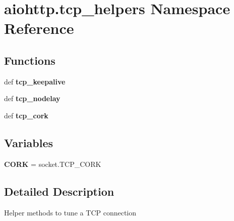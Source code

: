 \hypertarget{namespaceaiohttp_1_1tcp__helpers}{}\section{aiohttp.\+tcp\+\_\+helpers Namespace Reference}
\label{namespaceaiohttp_1_1tcp__helpers}
\subsection*{Functions}
\begin{DoxyCompactItemize}
\item 
\mbox{\label{namespaceaiohttp_1_1tcp__helpers_abf7dd11531b2f866252539a04281cc11}} 
def {\bfseries tcp\+\_\+keepalive}
\item 
\mbox{\label{namespaceaiohttp_1_1tcp__helpers_a842d5b35d23cf0d4f15d2395700875fd}} 
def {\bfseries tcp\+\_\+nodelay}
\item 
\mbox{\label{namespaceaiohttp_1_1tcp__helpers_a33a810874a563d09e35b6c4dab30fc6e}} 
def {\bfseries tcp\+\_\+cork}
\end{DoxyCompactItemize}
\subsection*{Variables}
\begin{DoxyCompactItemize}
\item 
\mbox{\label{namespaceaiohttp_1_1tcp__helpers_aeaa7cf3c0ebfb1805d278234ff28b20f}} 
{\bfseries C\+O\+RK} = socket.\+T\+C\+P\+\_\+\+C\+O\+RK
\end{DoxyCompactItemize}


\subsection{Detailed Description}
\begin{DoxyVerb}Helper methods to tune a TCP connection\end{DoxyVerb}
 